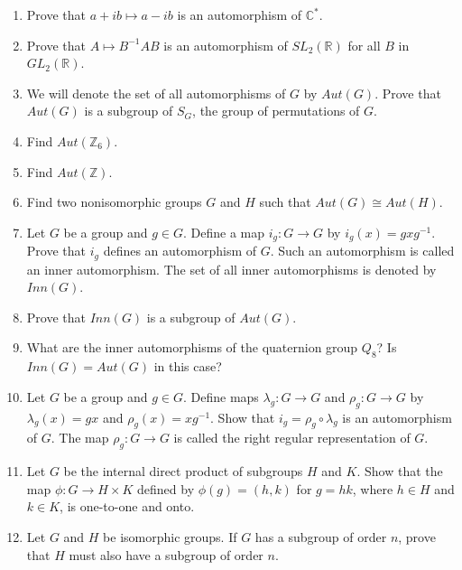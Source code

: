 {\begin{enumerate}
\item
Prove that $a + ib \mapsto a - ib$ is an automorphism of ${\mathbb C}^*$. 
 

\item
Prove that $A \mapsto B^{-1}AB$ is an automorphism of $SL_2({\mathbb R})$
for all $B$ in $GL_2({\mathbb R})$. 
 

\item
We will denote the set of all automorphisms of $G$ by
$Aut(G)$\label{noteauto}.  Prove that  $Aut(G)$ is a subgroup of
$S_G$, the group of permutations of $G$. 
 

\item
Find $Aut( {\mathbb Z}_6)$.
 

\item
Find $Aut( {\mathbb Z})$.
 

\item
Find two nonisomorphic groups $G$ and $H$ such that $Aut(G) \cong Aut(
H)$. 
 

\item
Let $G$ be a group and $g \in G$. Define a map $i_g : G \rightarrow
G$\label{noteinner} 
by $i_g(x) = g x g^{-1}$.  Prove that $i_g$ defines an automorphism of
$G$.  Such an automorphism is called an {\bfi inner
automorphism}. The set of all inner
automorphisms is denoted by $Inn(G)$\label{noteinneraut}. 
 

\item
Prove that $Inn(G)$ is a subgroup of $Aut(G)$.
 

\item
What are the inner automorphisms of the quaternion group $Q_8$? Is
$Inn(G) = Aut(G)$ in this case? 
 

\item
Let $G$ be a group and $g \in G$.  Define maps $\lambda_g :G
\rightarrow G$ and $\rho_g :G \rightarrow G$\label{noterightreg}
 by $\lambda_g(x) = gx$
and $\rho_g(x) = xg^{-1}$. Show that $i_g = \rho_g \circ \lambda_g$ is
an automorphism of $G$. The map $\rho_g :G \rightarrow G$ is called
the {\bfi right regular representation\/} of $G$. 
 

\item
Let $G$ be the internal direct product of subgroups $H$ and $K$.  Show
that the map $\phi : G \rightarrow H \times K$ defined by  $\phi(g) =
(h,k)$ for $g =hk$,  where $h \in H$ and  $k \in K$, is one-to-one and
onto. 
 

\item
Let $G$ and $H$ be isomorphic groups. If $G$ has a subgroup of order
$n$, prove that $H$ must also have a subgroup of  order $n$.
 


\end{enumerate}}
